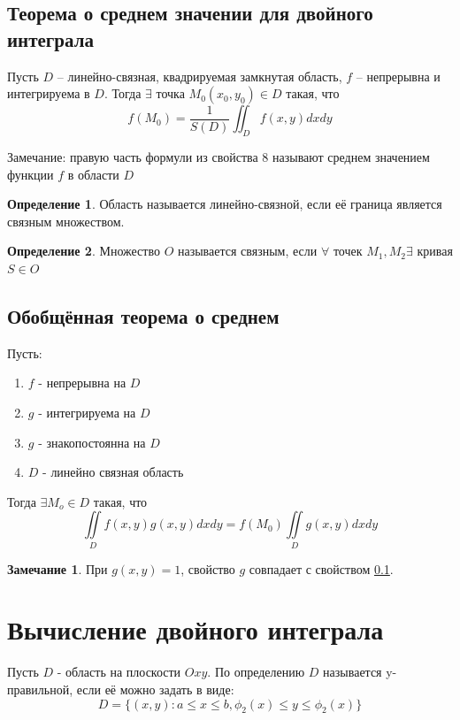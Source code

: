 \documentclass[a4paper, 14pt]{report}
\theoremstyle{definition}
\newtheorem*{definition}{Определение}
\newtheorem*{note}{Замечание}
\begin{document}
		\subsection{Теорема о среднем значении для двойного интеграла}\label{subsec:theorem_of_average}
			Пусть $D$ -- линейно-связная, квадрируемая замкнутая область, $f$ -- непрерывна и интегрируема в $D$. Тогда $\exists$ точка $M_0(x_0, y_0)\in D$ такая, что
			\begin{equation}
				f(M_0)=\frac{1}{S(D)}\iint_{D}f(x, y)dxdy
			\end{equation}
			
			Замечание: правую часть формули из свойства 8 называют среднем значением функции $f$ в области $D$
			
			\begin{definition}
				Область называется линейно-связной, если её граница является связным множеством.
			\end{definition}
			
			\begin{definition}
				Множество $O$ называется связным, если $\forall$ точек $M_1, M_2 \exists$ кривая $S\in O$
			\end{definition}
		\subsection{Обобщённая теорема о среднем}
			Пусть:
			\begin{enumerate}
				\item $f$ - непрерывна на $D$
				\item $g$ - интегрируема на $D$
				\item $g$ - знакопостоянна на $D$
				\item $D$ - линейно связная область
			\end{enumerate}
			
			Тогда $\exists M_o\in D$ такая, что
			\begin{equation}
				\iint\limits_{D}f(x,y)g(x,y)dxdy=f(M_0)\iint\limits_{D}g(x,y)dxdy
			\end{equation}
		
			\begin{note}
				При $g(x,y)=1$, свойство $g$ совпадает с свойством \ref{subsec:theorem_of_average}.
			\end{note}
	\section{Вычисление двойного интеграла}
		Пусть $D$ - область на плоскости $Oxy$. По определению $D$ называется y-правильной, если её можно задать в виде:
		\begin{equation}
			\label{eq:y_right}
			D=\{(x, y): a \le x \le b, \phi_2(x)\le y\le\phi_2(x)\}
		\end{equation}
		
\end{document}
